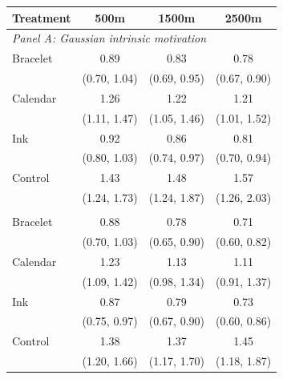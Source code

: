 \begin{tabular}{lccc}
\toprule
Treatment & 500m & 1500m & 2500m \\
\midrule
\multicolumn{4}{l}{\textit{Panel A: Gaussian intrinsic motivation}} \\
Bracelet & 0.89 & 0.83 & 0.78 \\
 & (0.70, 1.04) & (0.69, 0.95) & (0.67, 0.90) \\
Calendar & 1.26 & 1.22 & 1.21 \\
 & (1.11, 1.47) & (1.05, 1.46) & (1.01, 1.52) \\
Ink & 0.92 & 0.86 & 0.81 \\
 & (0.80, 1.03) & (0.74, 0.97) & (0.70, 0.94) \\
Control & 1.43 & 1.48 & 1.57 \\
 & (1.24, 1.73) & (1.24, 1.87) & (1.26, 2.03) \\
\addlinespace
\multicolumn{4}{l}{\textit{Panel B: Student-$t(5)$ intrinsic motivation}} \\
Bracelet & 0.88 & 0.78 & 0.71 \\
 & (0.70, 1.03) & (0.65, 0.90) & (0.60, 0.82) \\
Calendar & 1.23 & 1.13 & 1.11 \\
 & (1.09, 1.42) & (0.98, 1.34) & (0.91, 1.37) \\
Ink & 0.87 & 0.79 & 0.73 \\
 & (0.75, 0.97) & (0.67, 0.90) & (0.60, 0.86) \\
Control & 1.38 & 1.37 & 1.45 \\
 & (1.20, 1.66) & (1.17, 1.70) & (1.18, 1.87) \\
\bottomrule
\end{tabular}
